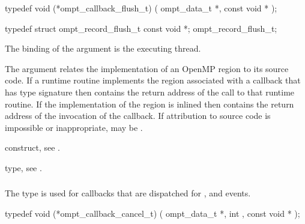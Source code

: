 \format
\begin{ccppspecific}
\begin{omptCallback}
typedef void (*ompt_callback_flush_t) (
  ompt_data_t *,
  const void *
);
\end{omptCallback}
\end{ccppspecific}

\record
\begin{ccppspecific}
\begin{omptRecord}
typedef struct ompt_record_flush_t {
  const void *;
} ompt_record_flush_t;
\end{omptRecord}
\end{ccppspecific}

\argdesc
The binding of the  argument is the executing thread.

The  argument relates the implementation of an OpenMP region
to its source code. If a runtime routine implements the region associated with
a callback that has type signature  then
 contains the return address of the call to that runtime routine.
If the implementation of the region is inlined then  contains the
return address of the invocation of the callback. If attribution to source code
is impossible or inappropriate,  may be .

\begin{crossrefs}
\item {} construct, see .

\item {} type, see .
\end{crossrefs}



\subsubsection{}
\label{sec:ompt_callback_cancel_t}

\summary
The  type is used for callbacks that are 
dispatched for ,  and  events.

\format
\begin{ccppspecific}
\begin{omptCallback}
typedef void (*ompt_callback_cancel_t) (
  ompt_data_t *,
  int ,
  const void *
);
\end{omptCallback}
\end{ccppspecific}

